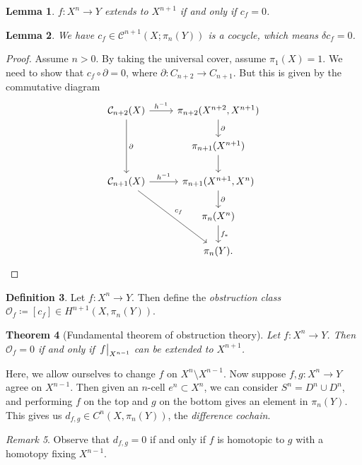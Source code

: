 \documentclass[leqno, openany]{memoir}
\newtheorem{thm}{Theorem}[section]
\newtheorem{lem}[thm]{Lemma}
\theoremstyle{definition}
\newtheorem{defn}[thm]{Definition}
\theoremstyle{remark}
\newtheorem{rmk}[thm]{Remark}
\theoremstyle{plain}
\theoremstyle{definition}
\theoremstyle{remark}
\newcommand{\mc}[1]{\mathcal{#1}}
\begin{document}
\begin{lem} $f \colon X^n \to Y$ extends to $X^{n+1}$ if and only if $c_f = 0$.
\end{lem}

\begin{lem} We have $c_f \in \mc{C}^{n+1}(X; \pi_n(Y))$ is a cocycle, which
means $\delta c_f = 0$.  \end{lem}

\begin{proof} Assume $n > 0$. By taking the universal cover, assume $\pi_1(X) =
    1$. We need to show that $c_f \circ \partial = 0$, where $\partial \colon
    C_{n+2} \to C_{n+1}$. But this is given by the commutative diagram
    \begin{equation*} \begin{tikzcd} \mc{C}_{n+2}(X) \ar{r}{h^{-1}}
        \ar{dd}{\partial} & \pi_{n+2}(X^{n+2}, X^{n+1}) \ar{d}{\partial} \\ &
        \pi_{n+1}(X^{n+1}) \ar{d} \\ \mc{C}_{n+1}(X) \ar{r}{h^{-1}}
        \ar{ddr}{c_f} & \pi_{n+1}(X^{n+1}, X^n) \ar{d}{\partial} \\ &
    \pi_n(X^n) \ar{d}{f_*} \\ & \pi_n(Y). \qedhere \end{tikzcd} \end{equation*}
\end{proof}

\begin{defn} Let $f \colon X^n \to Y$. Then define the \textit{obstruction
class} $\mc{O}_f \coloneqq [c_f] \in H^{n+1}(X, \pi_n(Y))$.  \end{defn}

\begin{thm}[Fundamental theorem of obstruction theory] Let $f \colon X^n \to
Y$. Then $\mc{O}_f = 0$ if and only if $\eval{f}_{X^{n-1}}$ can be extended to
$X^{n+1}$.  \end{thm}

Here, we allow ourselves to change $f$ on $X^n \setminus X^{n-1}$. Now suppose
$f, g \colon X^n \to Y$ agree on $X^{n-1}$. Then given an $n$-cell $e^n \subset
X^n$, we can consider $S^n = D^n \cup D^n$, and performing $f$ on the top and
$g$ on the bottom gives an element in $\pi_n(Y)$. This gives us $d_{f, g} \in
C^n(X, \pi_n(Y))$, the \textit{difference cochain}. 

\begin{rmk} Observe that $d_{f,g} = 0$ if and only if $f$ is homotopic to $g$
with a homotopy fixing $X^{n-1}$.  \end{rmk}
\end{document}
